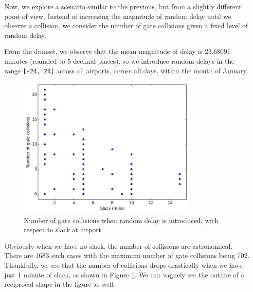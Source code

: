 \documentclass[12pt, a4paper]{report}
\begin{document}

Now, we explore a scenario similar to the previous, but from a slightly different point of view. Instead of increasing the magnitude of random delay until we observe a collision, we consider the number of gate collisions given a fixed level of random delay.

From the dataset, we observe that the mean magnitude of delay is 23.68091 minutes (rounded to 5 decimal places), so we introduce random delays in the range \texttt{[-24, 24]} across all airports, across all days, within the month of January.

\begin{figure}[h!]
\centering
\includegraphics[width=0.8\textwidth]{../graph/3aii.png}
\caption{Number of gate collisions when random delay is introduced, with respect to slack at airport}
\label{fig:3aii}
\end{figure}

\newpage
Obviously when we have no slack, the number of collisions are astronomical. There are 1683 such cases with the maximum number of gate collisions being 702. Thankfully, we see that the number of collisions drops drastically when we have just 1 minute of slack, as shown in Figure \ref{fig:3aii}. We can vaguely see the outline of a reciprocal shape in the figure as well.


\newpage
\end{document}
